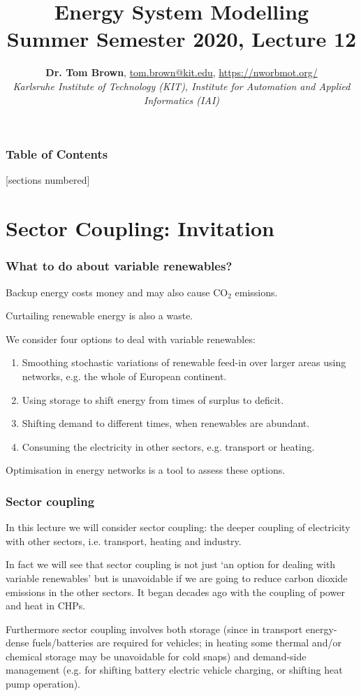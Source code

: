 \documentclass[10pt,aspectratio=169,dvipsnames]{beamer}
\title{Energy System Modelling\\ Summer Semester 2020, Lecture 12}
\author{
  {\bf Dr. Tom Brown}, \href{mailto:tom.brown@kit.edu}{tom.brown@kit.edu}, \url{https://nworbmot.org/}\\
  \emph{Karlsruhe Institute of Technology (KIT), Institute for Automation and Applied Informatics (IAI)}
}
\date{}
\let\olditem\item
\renewcommand{\item}{%
\olditem\vspace{5pt}}
\begin{document}
\maketitle


\begin{frame}

  \frametitle{Table of Contents}
  [sections numbered]
  \tableofcontents[hideallsubsections]
\end{frame}

\section{Sector Coupling: Invitation}


\begin{frame}
  \frametitle{What to do about variable renewables?}

  Backup energy costs money and may also cause CO${}_2$ emissions.

  Curtailing renewable energy is also a waste.

  We consider \alert{four options} to deal with variable renewables:
  \begin{enumerate}
  \item Smoothing stochastic variations of renewable feed-in over \alert{larger areas using networks}, e.g. the whole of European continent.
  \item Using \alert{storage} to shift energy from times of surplus to deficit.
  \item \alert{Shifting demand} to different times, when renewables are abundant.
    \item Consuming the electricity in \alert{other sectors}, e.g. transport or heating.
  \end{enumerate}

\alert{Optimisation} in energy networks is a tool to assess these options.

\end{frame}

\begin{frame}
  \frametitle{Sector coupling}

  In this lecture we will consider \alert{sector coupling}: the deeper
  coupling of electricity with other sectors, i.e. transport, heating
  and industry.

  In fact we will see that sector coupling is not just `an option for
  dealing with variable renewables' but is \alert{unavoidable} if we
  are going to reduce carbon dioxide emissions in the other
  sectors. It began decades ago with the coupling of power and
  heat in CHPs.

  Furthermore sector coupling involves both \alert{storage} (since in
  transport energy-dense fuels/batteries are required for vehicles; in
  heating some thermal and/or chemical storage may be unavoidable for cold snaps) and
  \alert{demand-side management} (e.g. for shifting battery electric
  vehicle charging, or shifting heat pump operation).


\end{frame}
\end{document}
